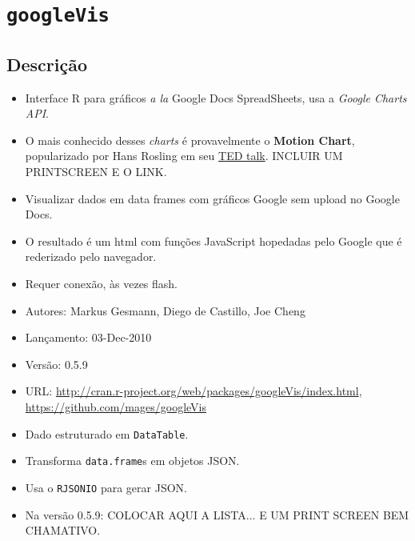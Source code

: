 \section{\texttt{googleVis}}


\subsection{Descrição}

\begin{frame}

  \begin{itemize}
  \item Interface R para gráficos \textit{a la} Google Docs SpreadSheets, usa a
    \emph{Google Charts API}.
  \item O mais conhecido desses \textit{charts} é provavelmente o
    \textbf{Motion Chart}, popularizado por Hans Rosling em seu
    \href{??}{TED talk}. INCLUIR UM PRINTSCREEN E O LINK.
  \item Visualizar dados em data frames com gráficos Google sem upload
    no Google Docs.
  \item O resultado é um html com funções JavaScript hopedadas pelo
    Google que é rederizado pelo navegador.
  \item Requer conexão, às vezes flash.
  \end{itemize}

  \begin{itemize}
  \item Autores: Markus Gesmann, Diego de Castillo, Joe Cheng
  \item Lançamento: 03-Dec-2010
  \item Versão: 0.5.9
  \item URL:
    \url{http://cran.r-project.org/web/packages/googleVis/index.html},
    \url{https://github.com/mages/googleVis}
  \end{itemize}
  
\end{frame}

\begin{frame}
  \begin{itemize}
  \item Dado estruturado em \texttt{DataTable}.
  \item Transforma \texttt{data.frame}s em objetos JSON.
  \item Usa o \texttt{RJSONIO} para gerar JSON.
  \item Na versão 0.5.9: COLOCAR AQUI A LISTA... E UM PRINT SCREEN BEM CHAMATIVO.
  \end{itemize}
\end{frame}

